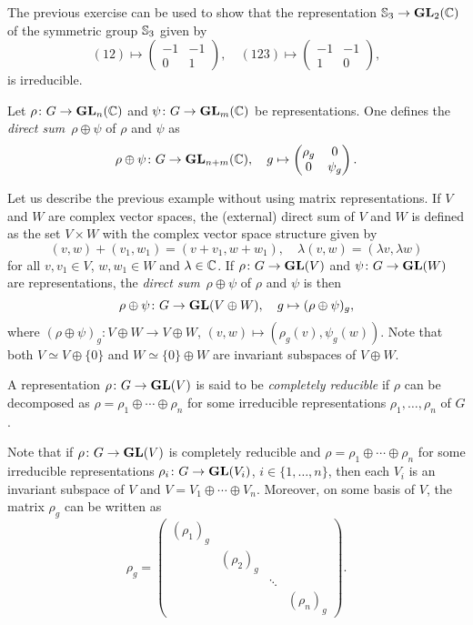 The previous exercise can be used to show that the representation
$\mathbb{S}_3\to\mathbf{GL}_2(\mathbb{C})$
of the symmetric group $\mathbb{S}_3$
given by
\[
(12)\mapsto\begin{pmatrix}
-1&-1\\0&1
\end{pmatrix},
\quad
(123)\mapsto\begin{pmatrix}
-1&-1\\
1&0
\end{pmatrix},
\]
is irreducible.

\begin{example}
\label{exa:direct_sum_reps}
Let $\rho\colon G\to\mathbf{GL}_n(\mathbb{C})$ and $\psi\colon G\to\mathbf{GL}_m(\mathbb{C})$ be representations. One defines
the \emph{direct sum} $\rho\oplus\psi$ of $\rho$ and $\psi$ as 
\[
\rho\oplus\psi\colon G\to\mathbf{GL}_{n+m}(\mathbb{C}),\quad
g\mapsto 
\begin{pmatrix}
\rho_g & 0\\
0 & \psi_g	
\end{pmatrix}.
\]
\end{example}

Let us describe the previous example without using matrix representations. If $V$ and 
$W$ are complex vector spaces, the (external) direct sum of $V$ and $W$ is defined
as the set $V\times W$ with the complex vector space structure given by
\[
(v,w)+(v_1,w_1)=(v+v_1,w+w_1),\quad
\lambda (v,w)=(\lambda v,\lambda w)
\]
for all $v,v_1\in V$, $w,w_1\in W$ and $\lambda\in\mathbb{C}$. 
If $\rho\colon G\to\mathbf{GL}(V)$ and $\psi\colon G\to\mathbf{GL}(W)$ are representations, 
the \emph{direct sum} $\rho\oplus\psi$ of $\rho$ and $\psi$ is then 
\[
\rho\oplus\psi\colon G\to\mathbf{GL}(V\oplus W),\quad
g\mapsto (\rho\oplus\psi)_g,
\]
where $(\rho\oplus\psi)_g\colon V\oplus W\to V\oplus W$, 
$(v,w)\mapsto (\rho_g(v),\psi_g(w))$. Note that both 
$V\simeq V\oplus\{0\}$ and $W\simeq \{0\}\oplus W$ are
invariant subspaces of $V\oplus W$. 

\begin{definition}
    A representation $\rho\colon G\to\mathbf{GL}(V)$ is said to be 
    \emph{completely reducible}
    if $\rho$ can be decomposed as
    $\rho=\rho_1\oplus\cdots\oplus \rho_n$ for some irreducible
    representations $\rho_1,\dots,\rho_n$ of $G$. 
\end{definition}

Note that if $\rho\colon G\to\mathbf{GL}(V)$ is completely reducible and 
$\rho=\rho_1\oplus\cdots\oplus \rho_n$ for some irreducible representations 
$\rho_i\colon G\to\mathbf{GL}(V_i)$, $i\in\{1,\dots,n\}$, then 
each $V_i$ is an invariant subspace of $V$ and $V=V_1\oplus \cdots \oplus V_n$. 
Moreover, on some basis of $V$, the matrix  
$\rho_g$ can be written as 
\[
\rho_g=\begin{pmatrix}
(\rho_1)_g &  \\
& (\rho_2)_g  \\
&&\ddots\\
&&&(\rho_n)_g	
\end{pmatrix}.
\]

